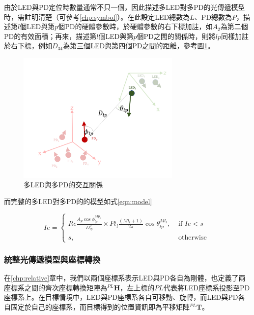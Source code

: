     由於LED與PD定位時數量通常不只一個，因此描述多LED對多PD的光傳遞模型時，需註明清楚（可參考\ref{chp:symbol}）。在此設定LED總數為$L$、PD總數為$P$，描述第$l$個LED與第$p$個PD的硬體參數時，於硬體參數的右下標加註，如$A_2$為第二個PD的有效面積；再來，描述第$l$個LED與第$p$個PD之間的關係時，則將$lp$同樣加註於右下標，例如$D_34$為第三個LED與第四個PD之間的距離，參考圖\ref{pic:interactive_mul}。
    
    \begin{figure}[ht]
        \centering
        \includegraphics[width=8cm]{ch2pic/interactive_mul.png}
        \caption{多LED與多PD的交互關係}
        \label{pic:interactive_mul}
    \end{figure}

    而完整的多LED對多PD的的模型如式\ref{eqn:model}
    
    \begin{equation}
        \label{eqn:model}
        Ie = \begin{cases}Re \frac{ A_p\cos\phi_{lp}^{Mp_{p}} }{D^2_{lp}}\times Pt_l\frac{(Ml_{l}+1)}{2 \pi} \cos \theta_{lp}^{Ml_{l}}, & \text { if } Ie<s \\ s, & \text { otherwise }\end{cases}
    \end{equation}




    \subsubsection{統整光傳遞模型與座標轉換}
    \label{chp:model_transform}

    在\ref{chp:relative}章中，我們以兩個座標系表示LED與PD各自為剛體，也定義了兩座標系之間的齊次座標轉換矩陣為$^{PL}\boldsymbol{H}$，左上標的$PL$代表將LED座標系投影至PD座標系上。在目標情境中，LED與PD座標系各自可移動、旋轉，而LED與PD各自固定於自己的座標系，而目標得到的位置資訊即為平移矩陣$^{PL}\boldsymbol{T}$。

